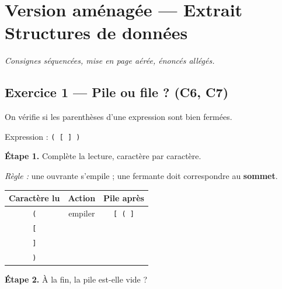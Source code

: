 \section*{Version aménagée --- Extrait Structures de données}
\textit{Consignes séquencées, mise en page aérée, énoncés allégés.}

\bigskip

\subsection*{Exercice 1 --- Pile ou file ? (C6, C7)}

On vérifie si les parenthèses d'une expression sont bien fermées.

\medskip
Expression : \texttt{( [ ] )}

\bigskip

\textbf{Étape 1.} Complète la lecture, caractère par caractère.

\medskip
\textit{Règle :} une ouvrante s'empile ; une fermante doit correspondre au
\textbf{sommet}.

\bigskip

\begin{center}
\begin{tabular}{|c|c|c|}
\hline
\textbf{Caractère lu} & \textbf{Action} & \textbf{Pile après} \\
\hline
\texttt{(} & empiler & \texttt{[ ( ]} \\
\hline
\texttt{[} & \dotfill & \dotfill \\
\hline
\texttt{]} & \dotfill & \dotfill \\
\hline
\texttt{)} & \dotfill & \dotfill \\
\hline
\end{tabular}
\end{center}

\bigskip

\textbf{Étape 2.} À la fin, la pile est-elle vide ?

\medskip
\begin{center}
 \qquad {}
\end{center}

